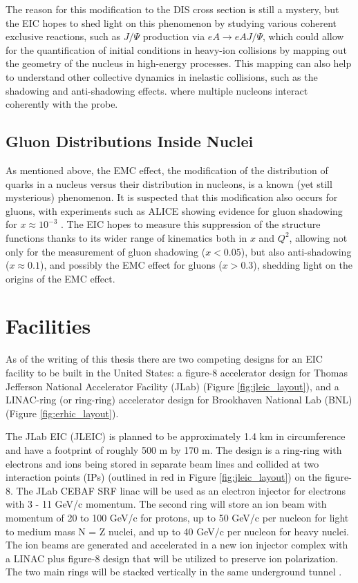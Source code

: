 The reason for this modification to the DIS cross section is still a mystery, but the EIC hopes to shed light on this phenomenon by studying various coherent exclusive reactions, such as $J/\Psi$ production via $eA \rightarrow eAJ/\Psi$, which could allow for the quantification of initial conditions in heavy-ion collisions by mapping out the geometry of the nucleus in high-energy processes. This mapping can also help to understand other collective dynamics in inelastic collisions, such as the shadowing and anti-shadowing effects. where multiple nucleons interact coherently with the probe.

\subsection{Gluon Distributions Inside Nuclei}
As mentioned above, the EMC effect, the modification of the distribution of quarks in a nucleus versus their distribution in nucleons, is a known (yet still mysterious) phenomenon. It is suspected that this modification also occurs for gluons, with experiments such as ALICE showing evidence for gluon shadowing for $x \approx 10^{-3}$ \cite{ALICE_antishadowing}. The EIC hopes to measure this suppression of the structure functions thanks to its wider range of kinematics both in $x$ and $Q^2$, allowing not only for the measurement of gluon shadowing ($x < 0.05$), but also anti-shadowing ($x \approx 0.1$), and possibly the EMC effect for gluons ($x > 0.3$), shedding light on the origins of the EMC effect.

\section{Facilities}
As of the writing of this thesis there are two competing designs for an EIC facility to be built in the United States: a figure-8 accelerator design for Thomas Jefferson National Accelerator Facility (JLab) (Figure \ref{fig:jleic_layout}), and a LINAC-ring (or ring-ring) accelerator design for Brookhaven National Lab (BNL) (Figure \ref{fig:erhic_layout}).

The JLab EIC (JLEIC) is planned to be approximately 1.4 km in circumference and have a footprint of roughly 500 m by 170 m. The design is a ring-ring with electrons and ions being stored in separate beam lines and collided at two interaction points  (IPs) (outlined in red in Figure \ref{fig:jleic_layout}) on the figure-8. The JLab CEBAF SRF linac will be used as an electron injector for electrons with 3 - 11 GeV/c momentum. The second ring will store an ion beam with momentum of 20 to 100 GeV/c for protons, up to 50 GeV/c per nucleon for light to medium mass N = Z nuclei, and up to 40 GeV/c per nucleon for heavy nuclei. The ion beams are generated and accelerated in a new ion injector complex with a LINAC plus figure-8 design that will be utilized to preserve ion polarization. The two main rings will be stacked vertically in the same underground tunnel \cite{JLEICdesign}.

